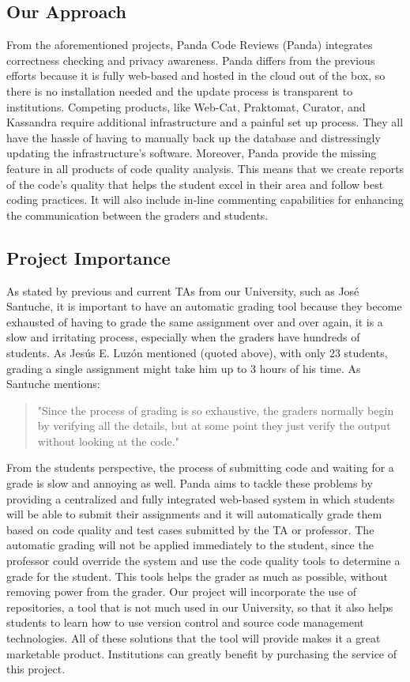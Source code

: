 
\subsection{Our Approach}

From the aforementioned projects, Panda Code Reviews (Panda) integrates
correctness checking and privacy awareness. Panda differs from the previous
efforts because it is fully web-based and hosted in the cloud out of the box, so
there is no installation needed and the update process is transparent to
institutions. Competing products, like Web-Cat, Praktomat, Curator, and
Kassandra require additional infrastructure and a painful set up process. They
all have the hassle of having to manually back up the database and distressingly
updating the infrastructure's software. Moreover, Panda provide the missing
feature in all products of code quality analysis. This means that we create
reports of the code's quality that helps the student excel in their area and
follow best coding practices. It will also include in-line commenting
capabilities for enhancing the communication between the graders and students.

\subsection{Project Importance}

As stated by previous and current TAs from our University, such as José
Santuche, it is important to have an automatic grading tool because they become
exhausted of having to grade the same assignment over and over again, it is a
slow and irritating process, especially when the graders have hundreds of
students. As Jesús E. Luzón mentioned (quoted above), with only 23 students,
grading a single assignment might take him up to 3 hours of his time. As
Santuche mentions: \begin{quote} "Since the process of grading is so exhaustive,
the graders normally begin by verifying all the details, but at some point they
just verify the output without looking at the code." \end{quote} From the
students perspective, the process of submitting code and waiting for a grade is
slow and annoying as well. Panda aims to tackle these problems by providing a
centralized and fully integrated web-based system in which students will be able
to submit their assignments and it will automatically grade them based on code
quality and test cases submitted by the TA or professor. The automatic grading
will not be applied immediately to the student, since the professor could
override the system and use the code quality tools to determine a grade for the
student. This tools helps the grader as much as possible, without removing power
from the grader. Our project will incorporate the use of repositories, a tool
that is not much used in our University, so that it also helps students to learn
how to use version control and source code management technologies. All of
these solutions that the tool will provide makes it a great marketable product.
Institutions can greatly benefit by purchasing the service of this project.

